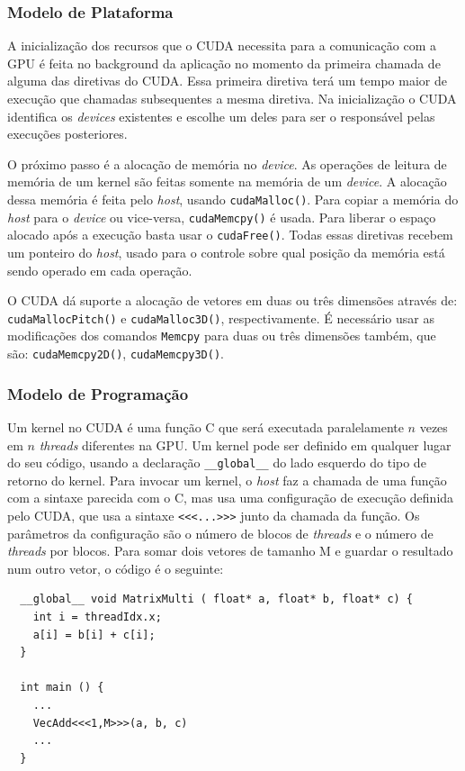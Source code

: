 \subsubsection{Modelo de Plataforma}
A inicialização dos recursos que o CUDA necessita para a comunicação com a GPU é feita no background da
aplicação no momento da primeira chamada de alguma das diretivas do CUDA. Essa primeira diretiva terá um
tempo maior de execução que chamadas subsequentes a mesma diretiva. Na inicialização o CUDA identifica
os \textit{devices} existentes e escolhe um deles para ser o responsável pelas execuções posteriores.

O próximo passo é a alocação de memória no \textit{device}. As operações de leitura de memória de um kernel são feitas somente
na memória de um \textit{device}. A alocação dessa memória é feita pelo \textit{host}, usando \verb#cudaMalloc()#. 
Para copiar a memória do \textit{host} para o \textit{device} ou vice-versa,
\verb#cudaMemcpy()# é usada. Para liberar o espaço alocado após a execução basta usar o \verb#cudaFree()#.
Todas essas diretivas recebem um ponteiro do \textit{host}, usado para o controle sobre qual posição da memória está sendo
operado em cada operação.

O CUDA dá suporte a alocação de vetores em duas ou três dimensões através de: \verb#cudaMallocPitch()# e 
\verb#cudaMalloc3D()#, respectivamente. É necessário usar as modificações dos comandos \verb#Memcpy# para
duas ou três dimensões também, que são: \verb#cudaMemcpy2D()#, \verb#cudaMemcpy3D()#.

\subsubsection{Modelo de Programação}
Um kernel no CUDA é uma função C que será executada paralelamente $n$ vezes em $n$ \textit{threads} diferentes na GPU. Um kernel pode ser
definido em qualquer lugar do seu código, usando a declaração \verb#__global__# do lado esquerdo do tipo de retorno do kernel.
Para invocar um kernel, o \textit{host} faz a chamada de uma função com a sintaxe parecida com o C, mas usa uma configuração de
execução definida pelo CUDA, que usa a sintaxe \verb#<<<...>>># junto da chamada da função. Os parâmetros da configuração são
o número de blocos de \textit{threads} e o número de \textit{threads} por blocos. Para somar dois vetores de tamanho M e guardar o resultado num
outro vetor, o código é o seguinte:

\begin{lstlisting}
  __global__ void MatrixMulti ( float* a, float* b, float* c) { 
    int i = threadIdx.x;
    a[i] = b[i] + c[i];        
  }
                            
  int main () {               
    ...                       
    VecAdd<<<1,M>>>(a, b, c)  
    ...                       
  }                                 
\end{lstlisting}

